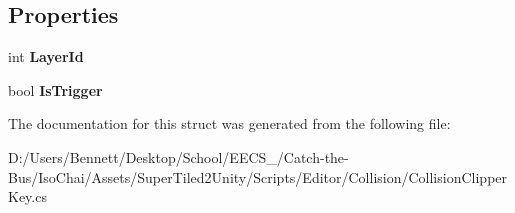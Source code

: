 \subsection*{Properties}
\begin{DoxyCompactItemize}
\item 
\mbox{\label{struct_super_tiled2_unity_1_1_editor_1_1_collision_clipper_key_aab8ad0e879364c2332b699ba5a089b4b}} 
int {\bfseries Layer\+Id}
\item 
\mbox{\label{struct_super_tiled2_unity_1_1_editor_1_1_collision_clipper_key_aeabbd994e964dc9a11d9ed6f9f512d69}} 
bool {\bfseries Is\+Trigger}
\end{DoxyCompactItemize}


The documentation for this struct was generated from the following file\+:\begin{DoxyCompactItemize}
\item 
D\+:/\+Users/\+Bennett/\+Desktop/\+School/\+E\+E\+C\+S\+\_/\+Catch-\/the-\/\+Bus/\+Iso\+Chai/\+Assets/\+Super\+Tiled2\+Unity/\+Scripts/\+Editor/\+Collision/Collision\+Clipper\+Key.\+cs\end{DoxyCompactItemize}
